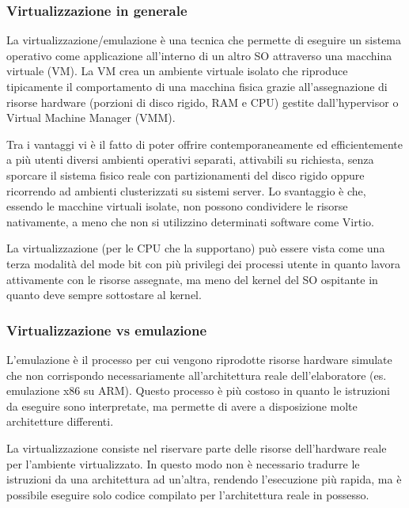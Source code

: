 \documentclass[a4paper]{article}
\begin{document}
\subsubsection*{Virtualizzazione in generale}
La virtualizzazione/emulazione è una tecnica che permette di eseguire un sistema operativo come applicazione all’interno di un
altro SO attraverso una macchina virtuale (VM). La VM crea un ambiente virtuale isolato che riproduce tipicamente il comportamento
di una macchina fisica grazie all'assegnazione di risorse hardware (porzioni di disco rigido, RAM e CPU) gestite dall'hypervisor
o Virtual Machine Manager (VMM).

Tra i vantaggi vi è il fatto di poter offrire contemporaneamente ed efficientemente a più utenti diversi ambienti operativi
separati, attivabili su richiesta, senza sporcare il sistema fisico reale con partizionamenti del disco rigido oppure ricorrendo
ad ambienti clusterizzati su sistemi server. Lo svantaggio è che, essendo le macchine virtuali isolate, non possono condividere
le risorse nativamente, a meno che non si utilizzino determinati software come Virtio.

La virtualizzazione (per le CPU che la supportano) può essere vista come una terza modalità del mode bit con più privilegi dei
processi utente in quanto lavora attivamente con le risorse assegnate, ma meno del kernel del SO ospitante in quanto deve
sempre sottostare al kernel.

\subsubsection*{Virtualizzazione vs emulazione}
L'emulazione è il processo per cui vengono riprodotte risorse hardware simulate che non corrispondo necessariamente
all'architettura reale dell'elaboratore (es. emulazione x86 su ARM). Questo processo è più costoso in quanto le istruzioni
da eseguire sono interpretate, ma permette di avere a disposizione molte architetture differenti.

La virtualizzazione consiste nel riservare parte delle risorse dell'hardware reale per l'ambiente virtualizzato. In questo modo
non è necessario tradurre le istruzioni da una architettura ad un'altra, rendendo l'esecuzione più rapida, ma è possibile eseguire
solo codice compilato per l'architettura reale in possesso.


\end{document}

